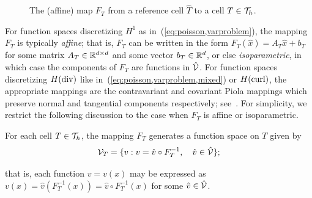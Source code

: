 \begin{figure}%
\bwfig
  \caption{The (affine) map $F_T$ from a reference cell $\hat{T}$
    to a cell $T \in \mathcal{T}_h$.}
  \label{fig:kirby-7:affinemap}
\end{figure}

%
For function spaces discretizing $H^1$ as
in~(\ref{eq:poisson,varproblem}), the mapping $F_T$ is typically
\emph{affine}; that is, $F_T$ can be written in the form $F_T(\hat{x})
= A_T \hat{x} + b_T$ for some matrix $A_T \in \mathbb{R}^{d\times d}$ and some
vector $b_T \in \mathbb{R}^d$, or else \emph{isoparametric}, in which case the
components of $F_T$ are functions in $\hat{\mathcal{V}}$. For function
spaces discretizing $H(\mathrm{div})$ like
in~(\ref{eq:poisson,varproblem,mixed}) or $H(\mathrm{curl})$, the appropriate
mappings are the contravariant and covariant Piola mappings which
preserve normal and tangential components respectively;
see~\citet{RognesKirbyLogg2009}. For simplicity, we restrict the
following discussion to the case when $F_T$ is affine or
isoparametric.

For each cell $T \in \mathcal{T}_h$, the mapping $F_T$ generates a
function space on $T$ given by
\begin{equation}
  \mathcal{V}_T = \{ v : v = \hat{v} \circ F_T^{-1}, \quad \hat{v} \in
  \hat{\mathcal{V}} \};
\end{equation}

\pagebreak

\noindent
that is, each function $v = v(x)$ may be expressed as $v(x) =
\hat{v}(F_T^{-1}(x)) = \hat{v} \circ F_T^{-1} (x)$ for some $\hat{v}
\in \hat{\mathcal{V}}$.

